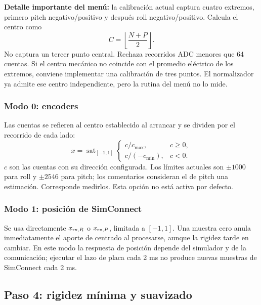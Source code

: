 \documentclass[11pt,a4paper]{article}
\newcommand{\sat}{\operatorname{sat}}
\begin{document}
\textbf{Detalle importante del menú:} la calibración actual captura cuatro extremos, primero pitch negativo/positivo y después roll negativo/positivo. Calcula el centro como
\begin{equation}
C=\left\lfloor\frac{N+P}{2}\right\rfloor.
\end{equation}
No captura un tercer punto central. Rechaza recorridos ADC menores que 64 cuentas. Si el centro mecánico no coincide con el promedio eléctrico de los extremos, conviene implementar una calibración de tres puntos. El normalizador ya admite ese centro independiente, pero la rutina del menú no lo mide.

\subsubsection{Modo 0: encoders}
Las cuentas se refieren al centro establecido al arrancar y se dividen por el recorrido de cada lado:
\begin{equation}
x=\sat_{[-1,1]}\begin{cases}
c/c_{\max},&c\ge0,\\
c/(-c_{\min}),&c<0.
\end{cases}
\end{equation}
$c$ son las cuentas con su dirección configurada. Los límites actuales son $\pm1000$ para roll y $\pm2546$ para pitch; los comentarios consideran el de pitch una estimación. Corresponde medirlos. Esta opción no está activa por defecto.

\subsubsection{Modo 1: posición de SimConnect}
Se usa directamente $x_{{\rm rx},R}$ o $x_{{\rm rx},P}$, limitada a $[-1,1]$. Una muestra cero anula inmediatamente el aporte de centrado al procesarse, aunque la rigidez tarde en cambiar. En este modo la respuesta de posición depende del simulador y de la comunicación; ejecutar el lazo de placa cada 2 ms no produce nuevas muestras de SimConnect cada 2 ms.

\subsection{Paso 4: rigidez mínima y suavizado}
\end{document}
